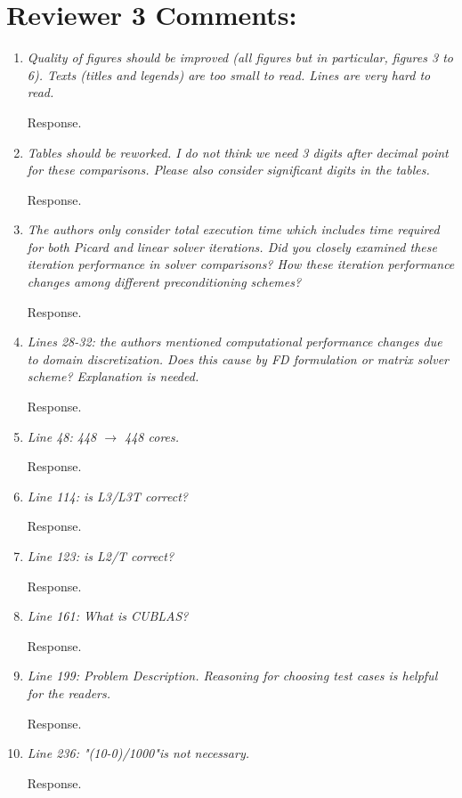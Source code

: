 \documentclass[12pt]{article} %
\begin{document}
\section*{Reviewer 3 Comments:}
\begin{enumerate}
\item \textit{Quality of figures should be improved (all figures but in particular, figures 3 to 6). Texts (titles and legends) are too small to read. Lines are very hard to read.} 

Response. 

\item \textit{Tables should be reworked. I do not think we need 3 digits after decimal point for these comparisons. Please also consider significant digits in the tables.} 

Response. 

\item \textit{The authors only consider total execution time which includes time required for both Picard and linear solver iterations. Did you closely examined these iteration performance in solver comparisons? How these iteration performance changes among different preconditioning schemes? } 

Response.

\item \textit{Lines 28-32: the authors mentioned computational performance changes due to domain discretization. Does this cause by FD formulation or matrix solver scheme? Explanation is needed. } 

Response.

\item \textit{Line 48: 448 $\rightarrow$ 448 cores. } 

Response.

\item \textit{Line 114: is L3/L3T correct? } 

Response.

\item \textit{Line 123: is L2/T correct? } 

Response.

\item \textit{Line 161: What is CUBLAS? } 

Response.

\item \textit{Line 199: Problem Description. Reasoning for choosing test cases is helpful for the readers. } 

Response.

\item \textit{Line 236: "(10-0)/1000"is not necessary.} 

Response.

\end{enumerate}
\end{document}

